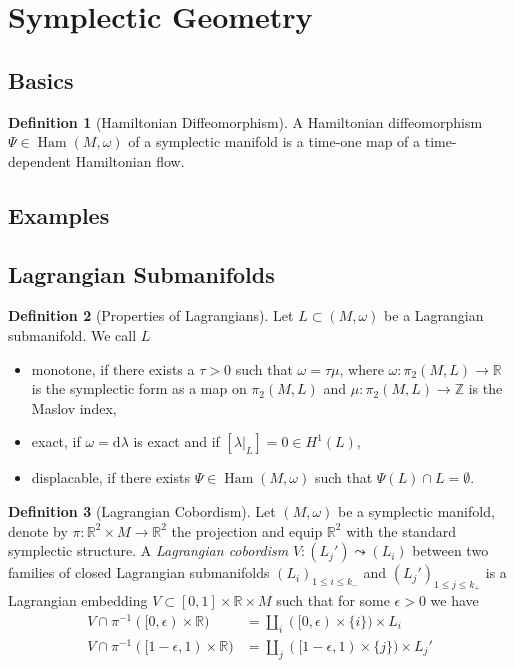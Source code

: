 \documentclass[a4paper]{article}
\newcommand{\RR}{\mathbb{R}}
\newcommand{\ZZ}{\mathbb{Z}}
\newcommand{\dd}{\mathrm{d}}
\newcommand{\lra}{\longrightarrow}
\theoremstyle{definition}
\theoremstyle{definition}
\newtheorem{definition}{Definition}
\theoremstyle{remark}
\theoremstyle{remark}
\begin{document}
\section{Symplectic Geometry}

\subsection{Basics}

\begin{definition}[Hamiltonian Diffeomorphism]
  A Hamiltonian diffeomorphism $\Psi\in\operatorname{Ham}(M,\omega)$ of a symplectic manifold is a time-one map of a time-dependent Hamiltonian flow.
\end{definition}

\subsection{Examples}

\subsection{Lagrangian Submanifolds}

\begin{definition}[Properties of Lagrangians]
Let $L\subset (M,\omega)$ be a Lagrangian submanifold. We call $L$
\begin{itemize}
  \item monotone, if there exists a $\tau>0$ such that $\omega=\tau\mu$, where $\omega:\pi_2(M,L)\lra\RR$ is the symplectic form as a map on $\pi_2(M,L)$ and $\mu:\pi_2(M,L)\lra\ZZ$ is the Maslov index,
  \item exact, if $\omega=\dd\lambda$ is exact and if $[\lambda|_L]=0\in H^1(L)$,
  \item displacable, if there exists $\Psi\in\operatorname{Ham}(M,\omega)$ such that $\Psi(L)\cap L=\emptyset$.
\end{itemize}
  
\end{definition}

\begin{definition}[Lagrangian Cobordism]
  Let $(M,\omega)$ be a symplectic manifold, denote by $\pi:\RR^2\times M\lra\RR^2$ the projection and equip $\RR^2$ with the standard symplectic structure. A \emph{Lagrangian cobordism} $V:(L_j')\leadsto(L_i)$ between two families of closed Lagrangian submanifolds $(L_i)_{1\leq i\leq k_-}$ and $(L_j')_{1\leq j\leq k_+}$  is a Lagrangian embedding $V\subset [0,1]\times\RR\times M$ such that for some $\epsilon>0$ we have
  \begin{align*}
    V\cap\pi^{-1}([0,\epsilon)\times \RR)&=\coprod_i([0,\epsilon)\times\{i\})\times L_i \\
    V\cap\pi^{-1}([1-\epsilon,1)\times \RR)&=\coprod_j([1-\epsilon,1)\times\{j\})\times L_j'
  \end{align*}
\end{definition}
\end{document}
